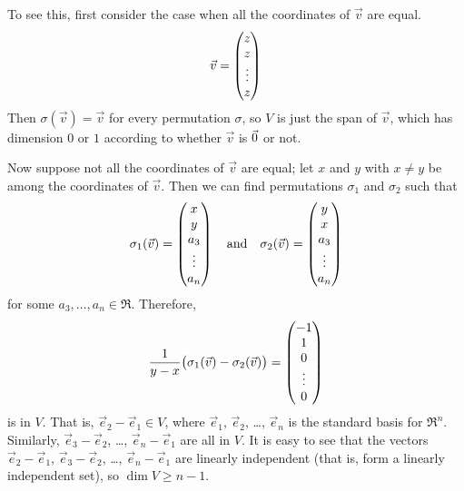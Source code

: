 \begin{exercises}
\begin{answer}
      To see this, first consider the case when all the coordinates of 
      $\vec{v}$ are equal.
      \begin{equation*}
         \vec{v}=\begin{pmatrix} z \\ z \\ \vdots \\ z \end{pmatrix}
      \end{equation*}
      Then $\sigma(\vec{v})=\vec{v}$ for every permutation $\sigma$, so
      $V$ is just the span of $\vec{v}$, which has dimension $0$ or $1$
      according to whether $\vec{v}$ is $\vec{0}$ or not.

      Now suppose not all the coordinates of $\vec{v}$ are equal; let $x$
      and $y$ with $x\neq y$ be among the coordinates of $\vec{v}$.
      Then we can find permutations $\sigma_1$ and $\sigma_2$ such that
      \begin{equation*}
        \sigma_1(\vec{v})=\begin{pmatrix} x \\ y \\ a_3 \\ \vdots \\ a_n \end{pmatrix}
        \quad\text{and}\quad
        \sigma_2(\vec{v})=\begin{pmatrix} y \\ x \\ a_3 \\ \vdots \\ a_n \end{pmatrix}
      \end{equation*}
      for some $a_3,\ldots,a_n\in\Re$.
      Therefore,
      \begin{equation*}
        \frac{1}{y-x}\bigl(\sigma_1(\vec{v})-\sigma_2(\vec{v})\bigr)=
        \begin{pmatrix} -1 \\ 1 \\ 0 \\ \vdots \\ 0 \end{pmatrix}
      \end{equation*}
      is in $V$.
      That is, $\vec{e}_2-\vec{e}_1\in V$, where $\vec{e}_1$, $\vec{e}_2$,
      \ldots, $\vec{e}_n$ is the standard basis for $\Re^n$.
      Similarly, $\vec{e}_3-\vec{e}_2$, \ldots, $\vec{e}_n-\vec{e}_1$
      are all in $V$.
      It is easy to see that the vectors
      $\vec{e}_2-\vec{e}_1$, $\vec{e}_3-\vec{e}_2$, \ldots, 
      $\vec{e}_n-\vec{e}_1$ are linearly independent (that is, form a linearly
      independent set), so $\dim V\geq n-1$.


\end{answer}
\end{exercises}
